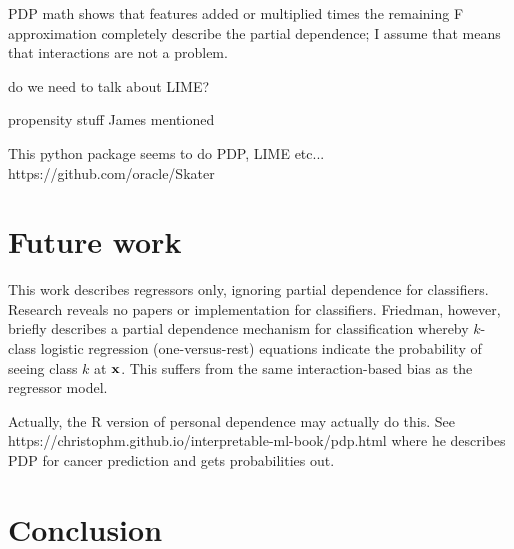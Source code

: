 \documentclass[12pt]{article}
\begin{document}
PDP math shows that features added or multiplied times the remaining F approximation completely describe the partial dependence; I assume that means that interactions are not a problem.

do we need to talk about LIME?

propensity stuff James mentioned
 
This python package seems to do PDP, LIME etc... https://github.com/oracle/Skater

\section{Future work}

This work describes regressors only, ignoring partial dependence for classifiers.  Research reveals no papers or implementation for classifiers. Friedman, however, briefly describes a partial dependence mechanism for classification whereby $k$-class logistic regression (one-versus-rest) equations indicate the probability of seeing class $k$ at $\bf{x}$.  This suffers from the same interaction-based bias as the regressor model.

Actually, the R version of personal dependence may actually do this. See https://christophm.github.io/interpretable-ml-book/pdp.html where he describes PDP for cancer prediction and gets probabilities out.

\section{Conclusion}
\label{sec:conc}




\end{document}
